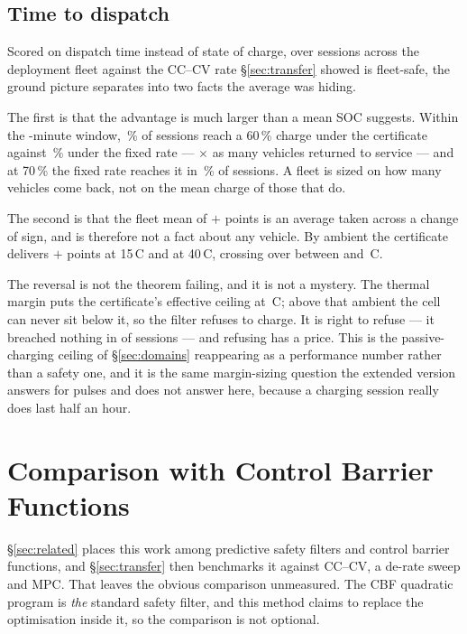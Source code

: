 \documentclass[11pt,letterpaper]{article}
\theoremstyle{definition}
\theoremstyle{remark}
\newcommand{\SI}[2]{#1\,#2}
\newcommand{\degreeCelsius}{\degC}
\newcommand{\degC}{\ifmmode{^\circ}\mathrm{C}\else\textdegree C\fi}
\begin{document}
\subsection{Time to dispatch}

Scored on dispatch time instead of state of charge, over \gtTrials{} sessions across the
deployment fleet against the CC--CV rate \S\ref{sec:transfer} showed is fleet-safe, the ground
picture separates into two facts the average was hiding.

The first is that the advantage is much larger than a mean SOC suggests. Within the
\gtWindow-minute window, \gtReachSixtyZg\,\% of sessions reach a 60\,\% charge under the certificate
against \gtReachSixtyCc\,\% under the fixed rate --- \gtReachSixtyRatio$\times$ as many vehicles
returned to service --- and at 70\,\% the fixed rate reaches it in \gtReachSeventyCc\,\% of sessions.
A fleet is sized on how many vehicles come back, not on the mean charge of those that do.

The second is that the fleet mean of $+$\gtMean{} points is an average taken across a change of
sign, and is therefore not a fact about any vehicle. By ambient the certificate delivers
$+$\gtAmbFifteen{} points at \SI{15}{\degreeCelsius} and \gtAmbForty{} at \SI{40}{\degreeCelsius}, crossing over between
\gtCrossLo{} and \SI{\gtCrossHi}{\degreeCelsius}.

The reversal is not the theorem failing, and it is not a mystery. The thermal margin puts the
certificate's effective ceiling at \SI{\gtCeiling}{\degreeCelsius}; above that ambient the cell can never sit
below it, so the filter refuses to charge. It is right to refuse --- it breached nothing in
\gtViol{} of \gtTrials{} sessions --- and refusing has a price. This is the passive-charging
ceiling of \S\ref{sec:domains} reappearing as a performance number rather than a safety one, and
it is the same margin-sizing question the extended version answers for pulses and does not
answer here, because a charging session really does last half an hour.


\section{Comparison with Control Barrier Functions}\label{sec:cbf}

\S\ref{sec:related} places this work among predictive safety filters and control barrier
functions, and \S\ref{sec:transfer} then benchmarks it against CC--CV, a de-rate sweep and MPC.
That leaves the obvious comparison unmeasured. The CBF quadratic program is \emph{the} standard
safety filter, and this method claims to replace the optimisation inside it, so the comparison
is not optional.
\end{document}

